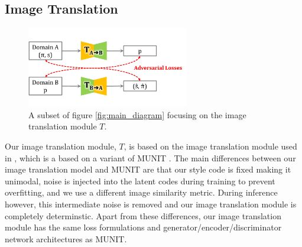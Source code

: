 \documentclass{article}
\begin{document}
\subsection{Image Translation}
\label{sec:image_translation}

\begin{figure}[H]
	\begin{center}
		\includegraphics[width=200pt]{../images/module_translator.pdf}
	\end{center}
	\caption{
		A subset of figure \ref{fig:main_diagram} focusing on the image translation module $T$.
	}
	\label{fig:module_translator}
\end{figure}






Our image translation module, $T$, is based on the image translation module used in \citep{surgical_video_translation}, which is a based on a variant \cite{surgical_image_translation} of MUNIT \cite{munit}. The main differences between our image translation model and MUNIT are that our style code is fixed making it unimodal, noise is injected into the latent codes during training to prevent overfitting, and we use a different image similarity metric. During inference however, this intermediate noise is removed and our image translation module is completely determinstic. Apart from these differences, our image translation module has the same loss formulations and generator/encoder/discriminator network architectures as MUNIT. 
\end{document}
